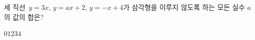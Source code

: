 세 직선~$y=3x$, $y=ax+2$, $y=-x+4$가 삼각형을 이루지 않도록 하는 모든 실수 $a$의 값의 합은?
\begin{choices32}{$0$}{$1$}{$2$}{$3$}{$4$}\end{choices32}
